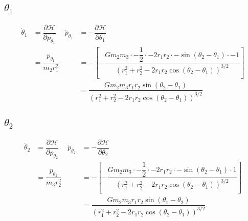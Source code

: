 \documentclass[12pt,a4paper,portrait]{article}
\begin{document}
	\subsection{$\theta_1$}
	\begin{align*}
		\dot{\theta}_1 &= \dfrac{\partial \mathcal{H}}{\partial p_{\theta_1}} & \dot{p}_{\theta_1} &= -\dfrac{\partial \mathcal{H}}{\partial \theta_1} \\
		&= \dfrac{p_{\theta_1}}{m_2r_1^2} & &=-\left[-\dfrac{Gm_2m_3\cdot -\dfrac{1}{2} \cdot -2r_1r_2\cdot -\sin{(\theta_2-\theta_1)}\cdot -1}{(r_1^2 + r_2^2 - 2r_1 r_2 \cos{(\theta_2-\theta_1)})^{3/2}}\right] \\
		& & &= \dfrac{Gm_2m_3r_1r_2 \sin{(\theta_2-\theta_1)}}{(r_1^2 + r_2^2 - 2r_1 r_2 \cos{(\theta_2-\theta_1)})^{3/2}}
	\end{align*}
	\subsection{$\theta_2$}
	\begin{align*}
		\dot{\theta}_2 &= \dfrac{\partial \mathcal{H}}{\partial p_{\theta_2}} & \dot{p}_{\theta_2} &= -\dfrac{\partial \mathcal{H}}{\partial \theta_2} \\
		&= \dfrac{p_{\theta_2}}{m_3r_2^2} & &= -\left[-\dfrac{Gm_2m_3\cdot -\dfrac{1}{2} \cdot -2r_1r_2 \cdot -\sin{(\theta_2-\theta_1)}\cdot 1}{(r_1^2 + r_2^2 - 2r_1 r_2 \cos{(\theta_2-\theta_1)})^{3/2}}\right] \\
		& & &=\dfrac{Gm_2m_3 r_1r_2 \sin{(\theta_1-\theta_2)}}{(r_1^2 + r_2^2 - 2r_1 r_2 \cos{(\theta_2-\theta_1)})^{3/2}}.
	\end{align*}
\end{document}
